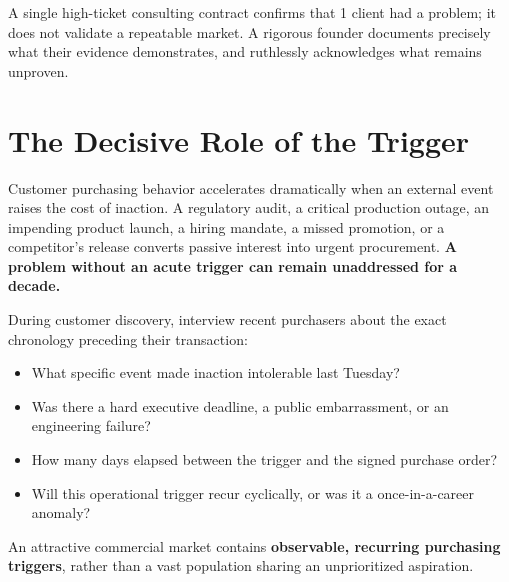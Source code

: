 A single high-ticket consulting contract confirms that 1 client had a problem; it does not validate a repeatable market. A rigorous founder documents precisely what their evidence demonstrates, and ruthlessly acknowledges what remains unproven.

\section{The Decisive Role of the Trigger}

Customer purchasing behavior accelerates dramatically when an external event raises the cost of inaction. A regulatory audit, a critical production outage, an impending product launch, a hiring mandate, a missed promotion, or a competitor's release converts passive interest into urgent procurement. \textbf{A problem without an acute trigger can remain unaddressed for a decade.}

During customer discovery, interview recent purchasers about the exact chronology preceding their transaction:
\begin{itemize}[leftmargin=12pt,itemsep=1pt,topsep=1pt]
  \item What specific event made inaction intolerable last Tuesday?
  \item Was there a hard executive deadline, a public embarrassment, or an engineering failure?
  \item How many days elapsed between the trigger and the signed purchase order?
  \item Will this operational trigger recur cyclically, or was it a once-in-a-career anomaly?
\end{itemize}

An attractive commercial market contains \textbf{observable, recurring purchasing triggers}, rather than a vast population sharing an unprioritized aspiration.
